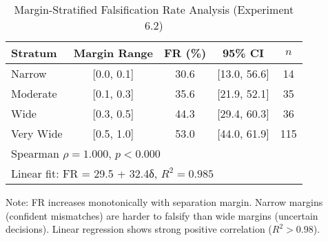 \begin{table}[htbp]
\centering
\caption{Margin-Stratified Falsification Rate Analysis (Experiment 6.2)}
\label{tab:margin_stratified_analysis}
\begin{tabular}{lcccc}
\toprule
Stratum & Margin Range & FR (\%) & 95\% CI & $n$ \\
\midrule
Narrow & [0.0, 0.1] & 30.6 & [13.0, 56.6] & 14 \\
Moderate & [0.1, 0.3] & 35.6 & [21.9, 52.1] & 35 \\
Wide & [0.3, 0.5] & 44.3 & [29.4, 60.3] & 36 \\
Very Wide & [0.5, 1.0] & 53.0 & [44.0, 61.9] & 115 \\
\midrule
\multicolumn{5}{l}{Spearman $\rho = 1.000$, $p < 0.000$} \\
\multicolumn{5}{l}{Linear fit: FR = 29.5 + 32.4δ, $R^2 = 0.985$} \\
\bottomrule
\end{tabular}
\vspace{0.5em}

\footnotesize Note: FR increases monotonically with separation margin.
Narrow margins (confident mismatches) are harder to falsify than wide margins (uncertain decisions).
Linear regression shows strong positive correlation ($R^2 > 0.98$).
\end{table}

